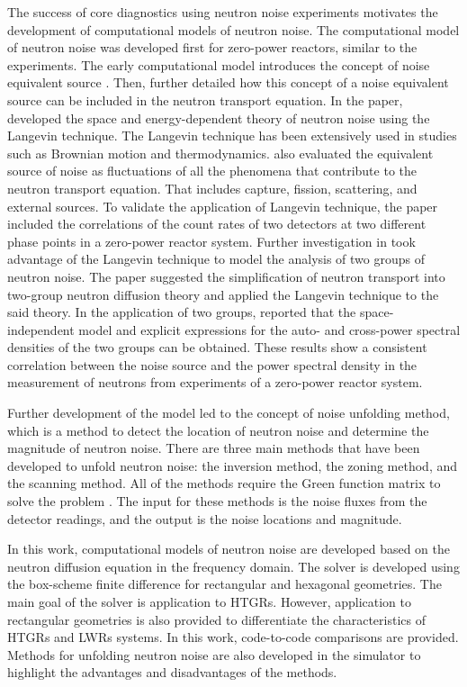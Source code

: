 The success of core diagnostics using neutron noise experiments motivates the development of computational models of neutron noise. The computational model of neutron noise was developed first for zero-power reactors, similar to the experiments. The early computational model introduces the concept of noise equivalent source \cite{cohnSimplifiedTheoryPile1960}. Then, \cite{akcasuApplicationLangevinTechnique1966} further detailed how this concept of a noise equivalent source can be included in the neutron transport equation. In the paper, \cite{akcasuApplicationLangevinTechnique1966} developed the space and energy-dependent theory of neutron noise using the Langevin technique. The Langevin technique has been extensively used in studies such as Brownian motion and thermodynamics. \cite{akcasuApplicationLangevinTechnique1966} also evaluated the equivalent source of noise as fluctuations of all the phenomena that contribute to the neutron transport equation. That includes capture, fission, scattering, and external sources. To validate the application of Langevin technique, the paper included the correlations of the count rates of two detectors at two different phase points in a zero-power reactor system. Further investigation in \cite{nietoTwogroupReactorNoise1968} took advantage of the Langevin technique to model the analysis of two groups of neutron noise. The paper suggested the simplification of neutron transport into two-group neutron diffusion theory and applied the Langevin technique to the said theory. In the application of two groups, \cite{nietoTwogroupReactorNoise1968} reported that the space-independent model and explicit expressions for the auto- and cross-power spectral densities of the two groups can be obtained. These results show a consistent correlation between the noise source and the power spectral density in the measurement of neutrons from experiments of a zero-power reactor system. 

Further development of the model led to the concept of noise unfolding method, which is a method to detect the location of neutron noise and determine the magnitude of neutron noise. There are three main methods that have been developed to unfold neutron noise: the inversion method, the zoning method, and the scanning method. All of the methods require the Green function matrix to solve the problem \cite{pazsitNoiseTechniquesNuclear2010}. The input for these methods is the noise fluxes from the detector readings, and the output is the noise locations and magnitude.

In this work, computational models of neutron noise are developed based on the neutron diffusion equation in the frequency domain. The solver is developed using the box-scheme finite difference for rectangular and hexagonal geometries. The main goal of the solver is application to \glspl*{HTGR}. However, application to rectangular geometries is also provided to differentiate the characteristics of \glspl*{HTGR} and \glspl*{LWR} systems. In this work, code-to-code comparisons are provided. Methods for unfolding neutron noise are also developed in the simulator to highlight the advantages and disadvantages of the methods. 


